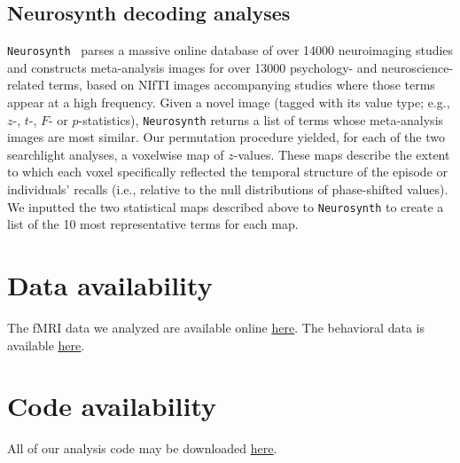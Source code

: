\documentclass[10pt]{article}
\begin{document}
\subsection*{Neurosynth decoding analyses}
\texttt{Neurosynth}~\citep{YarkEtal11} parses a massive online database of over 14000 neuroimaging studies and constructs meta-analysis images for over 13000 psychology- and neuroscience-related terms, based on NIfTI images accompanying studies where those terms appear at a high frequency.  Given a novel image (tagged with its value type; e.g., $z$-, $t$-, $F$- or $p$-statistics), \texttt{Neurosynth} returns a list of terms whose meta-analysis images are most similar.  Our permutation procedure yielded, for each of the two searchlight analyses, a voxelwise map of $z$-values.  These maps describe the extent to which each voxel specifically reflected the temporal structure of the episode or individuals' recalls (i.e., relative to the null distributions of phase-shifted values). We inputted the two statistical maps described above to \texttt{Neurosynth} to create a list of the 10 most representative terms for each map.

\section*{Data availability}
The fMRI data we analyzed are available online \href{http://dataspace.princeton.edu/jspui/handle/88435/dsp01nz8062179}{\underline{here}}.  The behavioral data is available  \href{https://github.com/ContextLab/sherlock-topic-model-paper}{\underline{here}}.

\section*{Code availability}
All of our analysis code may be downloaded \href{https://github.com/ContextLab/sherlock-topic-model-paper}{\underline{here}}.

%
%
\end{document}
